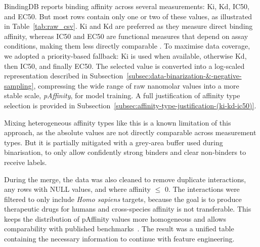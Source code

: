 BindingDB reports binding affinity across several measurements: Ki, Kd, IC50, and EC50.
But most rows contain only one or two of these values, as illustrated in Table~\ref{tab:raw_csv}.
Ki and Kd are preferred as they measure direct binding affinity, whereas IC50 and EC50 are functional measures that depend on assay conditions, making them less directly comparable \citep{He2017}.
To maximise data coverage, we adopted a priority-based fallback: Ki is used when available, otherwise Kd, then IC50, and finally EC50.
The selected value is converted into a log-scaled representation described in Subsection~\ref{subsec:data-binarization-&-negative-sampling}, compressing the wide range of raw nanomolar values into a more stable scale, \textit{pAffinity}, for model training.
A full justification of affinity type selection is provided in Subsection~\ref{subsec:affinity-type-justification-(ki-kd-ic50)}.

Mixing heterogeneous affinity types like this is a known limitation of this approach, as the absolute values are not directly comparable across measurement types.
But it is partially mitigated with a grey-area buffer used during binarisation, to only allow confidently strong binders and clear non-binders to receive labels.

During the merge, the data was also cleaned to remove duplicate interactions, any rows with NULL values, and where affinity $\leq$ 0.
The interactions were filtered to only include \textit{Homo sapiens} targets, because the goal is to produce therapeutic drugs for humans and cross-species affinity is not transferable.
This keeps the distribution of pAffinity values more homogeneous and allows comparability with published benchmarks~\citep{Ozturk2018, Yang2024}.
The result was a unified table containing the necessary information to continue with feature engineering.


